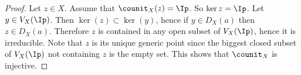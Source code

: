 \begin{proof}
Let $z\in X$.
Assume that $\counit_X(z)=\Ip$. 
So $\ker{z} = \Ip$.
Let $y\in V_X(\Ip)$. 
Then $\ker(z) \subset \ker(y)$, hence if $y \in D_X(a)$ then $z \in D_X(a)$.
Therefore $z$ is contained in any open subset of $V_X(\Ip)$, 
hence it is irreducible.
Note that $z$ is its unique generic point since the biggest closed subset of $V_X(\Ip)$ not containing $z$ is the empty set.
This shows that $\counit_X$ is injective.
\end{proof}